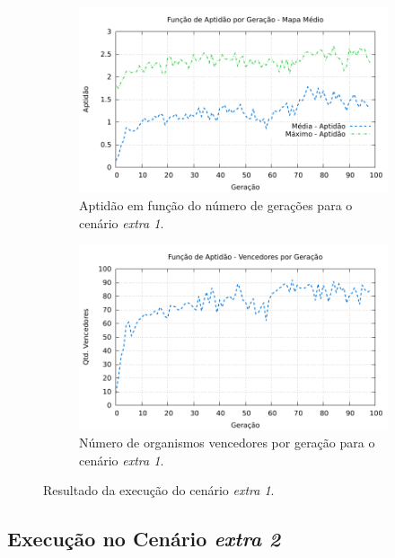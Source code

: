 \begin{figure}[H]
\centering
	\begin{subfigure}[b]{0.4\textwidth}
        \includegraphics[width=\textwidth]{fig/extra1-fitness.pdf}
        \caption{Aptidão em função do número de gerações para o cenário
        \textit{extra 1}.}
	\end{subfigure}
	\begin{subfigure}[b]{0.4\textwidth}
        \includegraphics[width=\textwidth]{fig/extra1-winners.pdf}
        \caption{Número de organismos vencedores por geração para o cenário
        \textit{extra 1}.}
	\end{subfigure}

    \caption{Resultado da execução do cenário \textit{extra 1}.}
	\label{fig:extra1-results}
\end{figure}

\subsection{Execução no Cenário \textit{extra 2}}

